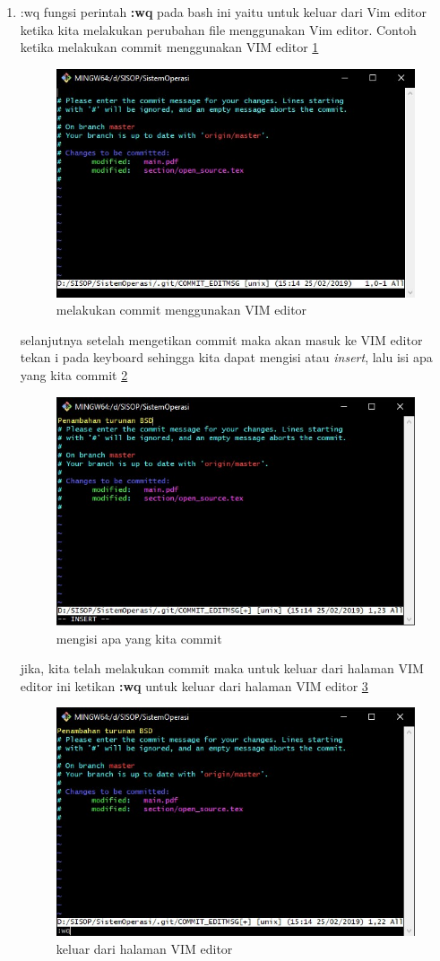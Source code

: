 \begin{enumerate}
\item :wq
	fungsi perintah \textbf{:wq} pada bash ini yaitu untuk keluar dari Vim editor ketika kita melakukan perubahan file menggunakan Vim editor.
Contoh ketika melakukan commit menggunakan VIM editor \ref{ss1}
\begin{figure}[!htbp]
\centerline{\includegraphics[width=.75\textwidth]{Figures/ss1.jpg}}
\caption{melakukan commit menggunakan VIM editor}
\label{ss1}
\end{figure}

selanjutnya setelah mengetikan commit maka akan masuk ke VIM editor tekan i pada keyboard sehingga kita dapat mengisi atau \textit{insert}, lalu isi apa yang kita commit \ref{ss2}
\begin{figure}[!htbp]
\centerline{\includegraphics[width=.75\textwidth]{Figures/ss2.jpg}}
\caption{mengisi apa yang kita commit}
\label{ss2}
\end{figure}

jika, kita telah melakukan commit maka untuk keluar dari halaman VIM editor ini ketikan \textbf{:wq} untuk keluar dari halaman VIM editor \ref{ss3}
\begin{figure}[!htbp]
\centerline{\includegraphics[width=.75\textwidth]{Figures/ss3.jpg}}
\caption{keluar dari halaman VIM editor}
\label{ss3}
\end{figure}
\end{enumerate}

